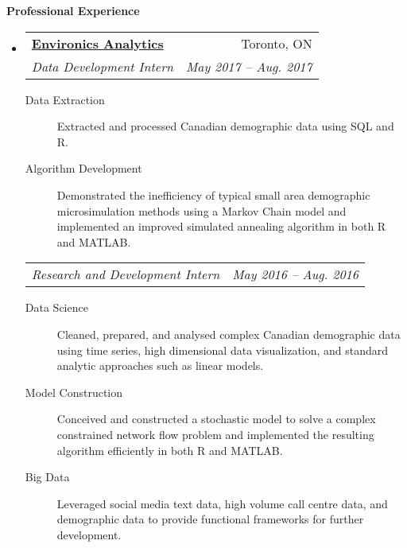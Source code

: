 \documentclass[letterpaper,10pt]{article}
\makeatletter
\newcommand{\resheading}[1]{\colorbox{resBlue}{\begin{minipage}{\textwidth}
			\textbf{#1}
\end{minipage}} \vspace{-14pt}}
\newcommand{\resitem}[4]{\begin{tabular*}{17.5cm}{l@{\extracolsep{\fill}}r} \textbf{#1} & #2 \\ \textit{#3} & \textit{#4} \\ \end{tabular*} \vspace{-6pt}}
\newcommand{\ressubitem}[2]{\begin{tabular*}{17.5cm}{l@{\extracolsep{\fill}}r} \textit{#1} & \textit{#2} \\ \end{tabular*} \vspace{-6pt}}
\makeatother
\begin{document}
\resheading{Professional Experience}
\begin{itemize}
\begin{comment}
\item
	\resitem{\href{https://www.ethz.ch/en.html}{ETH Z\"urich}}{Z\"urich, ZH}{Graduate Teaching Assistant}{Sept. 2018 -- Present}
		{\footnotesize \begin{description}
			\item[Teaching] Assisted in the administration and active instruction of master and bachelor students in the mathematics and computational details of analysis of variance and experimental design in the R programming language
		\end{description} \vspace{-4pt}}
\end{comment}
\item 
	\resitem{\href{https://www.environicsanalytics.com/en-ca/about}{Environics Analytics}}{Toronto, ON}{Data Development Intern}{May 2017 -- Aug. 2017}
		{\footnotesize \begin{description}
				\item[Data Extraction] Extracted and processed Canadian demographic data using SQL and R.
				\item[Algorithm Development] Demonstrated the inefficiency of typical small area demographic microsimulation methods using a Markov Chain model and implemented an improved simulated annealing algorithm in both R and MATLAB.
			\end{description} \vspace{-4pt}}
	\ressubitem{Research and Development Intern}{May 2016 -- Aug. 2016}
		{\footnotesize \begin{description}
				\item[Data Science] Cleaned, prepared, and analysed complex Canadian demographic data using time series, high dimensional data visualization, and standard analytic approaches such as linear models.
				\item[Model Construction] Conceived and constructed a stochastic model to solve a complex constrained network flow problem and implemented the resulting algorithm efficiently in both R and MATLAB.
				\item[Big Data] Leveraged social media text data, high volume call centre data, and demographic data to provide functional frameworks for further development.

\end{description}}
\end{itemize}
\end{document}

